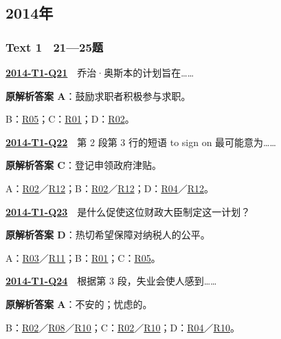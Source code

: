 \documentclass[11pt,a4paper]{article}
\begin{document}
\subsection{2014年}\label{year-2014}
\subsubsection{Text 1　21—25题}
\label{idx-2014-T1-Q21}\noindent\textbf{\href{https://zj139.github.io/math-notes/english/3becb5a63150d4e967a5c91f/\#q21}{2014-T1-Q21}}　乔治·奥斯本的计划旨在……\par\nopagebreak
\noindent\textbf{原解析答案 A}：鼓励求职者积极参与求职。\par\nopagebreak
\noindent B：\hyperref[cat-R05]{R05}；C：\hyperref[cat-R01]{R01}；D：\hyperref[cat-R02]{R02}。\par\smallskip
{}\label{idx-2014-T1-Q22}\noindent\textbf{\href{https://zj139.github.io/math-notes/english/3becb5a63150d4e967a5c91f/\#q22}{2014-T1-Q22}}　第 2 段第 3 行的短语 to sign on 最可能意为……\par\nopagebreak
\noindent\textbf{原解析答案 C}：登记申领政府津贴。\par\nopagebreak
\noindent A：\hyperref[cat-R02]{R02}／\hyperref[cat-R12]{R12}；B：\hyperref[cat-R02]{R02}／\hyperref[cat-R12]{R12}；D：\hyperref[cat-R04]{R04}／\hyperref[cat-R12]{R12}。\par\smallskip
{}\label{idx-2014-T1-Q23}\noindent\textbf{\href{https://zj139.github.io/math-notes/english/3becb5a63150d4e967a5c91f/\#q23}{2014-T1-Q23}}　是什么促使这位财政大臣制定这一计划？\par\nopagebreak
\noindent\textbf{原解析答案 D}：热切希望保障对纳税人的公平。\par\nopagebreak
\noindent A：\hyperref[cat-R03]{R03}／\hyperref[cat-R11]{R11}；B：\hyperref[cat-R01]{R01}；C：\hyperref[cat-R05]{R05}。\par\smallskip
{}\label{idx-2014-T1-Q24}\noindent\textbf{\href{https://zj139.github.io/math-notes/english/3becb5a63150d4e967a5c91f/\#q24}{2014-T1-Q24}}　根据第 3 段，失业会使人感到……\par\nopagebreak
\noindent\textbf{原解析答案 A}：不安的；忧虑的。\par\nopagebreak
\noindent B：\hyperref[cat-R02]{R02}／\hyperref[cat-R08]{R08}／\hyperref[cat-R10]{R10}；C：\hyperref[cat-R02]{R02}／\hyperref[cat-R10]{R10}；D：\hyperref[cat-R04]{R04}／\hyperref[cat-R10]{R10}。\par\smallskip
\end{document}
